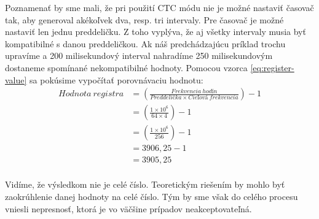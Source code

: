 Poznamenať by sme mali, že pri použití CTC módu nie je možné nastaviť časovač tak, aby generoval akékoľvek dva, resp. tri intervaly. Pre časovač je možné nastaviť
len jednu preddeličku. Z toho vyplýva, že aj všetky intervaly musia byť kompatibilné s danou preddeličkou. Ak náš predchádzajúcu príklad trochu upravíme
a 200 milisekundový interval nahradíme 250 milisekundovým dostaneme spomínané nekompatibilné hodnoty. Pomocou vzorca \ref{eq:register-value} sa pokúsime vypočítať
porovnávaciu hodnotu:
\begin{equation}
    \begin{aligned}
        Hodnota\:registra & = (\frac{Frekvencia\:hodín}{Preddelička \times Cieľová\:frekvencia}) - 1 \\
                          & = (\frac{1 \times 10^{6}}{64 \times 4}) - 1                              \\
                          & = (\frac{1 \times 10^{6}}{256}) - 1                                      \\
                          & = 3906,25 - 1                                                            \\
                          & = 3905,25                                                                \\
    \end{aligned}
\end{equation}

Vidíme, že výsledkom nie je celé číslo. Teoretickým riešením by mohlo byť zaokrúhlenie danej hodnoty na celé číslo. Tým by sme však do celého procesu vniesli nepresnosť,
ktorá je vo väčšine prípadov neakceptovateľná.

